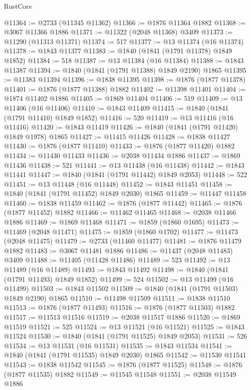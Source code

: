 \begin{lexlean}{RustCore}
\begin{coremodule}
@11364 := @2733 (@11345 @11362)
@11366 := @1876 @11364 @1882
@11368 := @3067 @11366 @1886
@11371 := @11322 (@2048 @11368) @3409
@11373 := @11290 (@11313 @11371)
@11374 := 517
@11377 := @13 @11374 (@16 @11374)
@11378 := @1843 @11377
@11383 := @1840 (@1841 (@1791 @11378) @1849 @1852)
@11384 := 518
@11387 := @13 @11384 (@16 @11384)
@11388 := @1843 @11387
@11394 := @1840 (@1841 (@1791 @11388) @1849 @2190) @1865
@11395 := @11383 @11394
@11396 := @1838 @11395
@11398 := @1876 (@1877 @11378)
@11401 := @1876 (@1877 @11388) @1882
@11402 := @11398 @11401
@11404 := @1874 @11402 @1886
@11405 := @1869 @11404
@11406 := 519
@11409 := @13 @11406 (@16 @11406)
@11410 := @1843 @11409
@11415 := @1840 (@1841 (@1791 @11410) @1849 @1852)
@11416 := 520
@11419 := @13 @11416 (@16 @11416)
@11420 := @1843 @11419
@11426 := @1840 (@1841 (@1791 @11420) @1849 @1978) @1865
@11427 := @11415 @11426
@11428 := @1838 @11427
@11430 := @1876 (@1877 @11410)
@11433 := @1876 (@1877 @11420) @1882
@11434 := @11430 @11433
@11436 := @2038 @11434 @1886
@11437 := @1869 @11436
@11438 := 521
@11441 := @13 @11438 (@16 @11438)
@11442 := @1843 @11441
@11447 := @1840 (@1841 (@1791 @11442) @1849 @2053)
@11448 := 522
@11451 := @13 @11448 (@16 @11448)
@11452 := @1843 @11451
@11458 := @1840 (@1841 (@1791 @11452) @1849 @2030) @1865
@11459 := @11447 @11458
@11460 := @1838 @11459
@11462 := @1876 (@1877 @11442)
@11465 := @1876 (@1877 @11452) @1882
@11466 := @11462 @11465
@11468 := @2038 @11466 @1886
@11469 := @1869 @11468
@11471 := @1859 (@1860 @1695)
@11473 := @11469 (@2048 @11471)
@11475 := @1859 (@1860 @1702)
@11477 := @11473 (@2048 @11475)
@11479 := @2733 (@11460 @11477)
@11481 := @1876 @11479 @1882
@11483 := @3067 @11481 @1886
@11486 := @11437 (@2048 @11483) @3409
@11488 := @11405 (@11428 @11486)
@11489 := 523
@11492 := @13 @11489 (@16 @11489)
@11493 := @1843 @11492
@11498 := @1840 (@1841 (@1791 @11493) @1849 @1852)
@11499 := 524
@11502 := @13 @11499 (@16 @11499)
@11503 := @1843 @11502
@11509 := @1840 (@1841 (@1791 @11503) @1849 @2190) @1865
@11510 := @11498 @11509
@11511 := @1838 @11510
@11513 := @1876 (@1877 @11493)
@11516 := @1876 (@1877 @11503) @1882
@11517 := @11513 @11516
@11519 := @2038 @11517 @1886
@11520 := @1869 @11519
@11521 := 525
@11524 := @13 @11521 (@16 @11521)
@11525 := @1843 @11524
@11530 := @1840 (@1841 (@1791 @11525) @1849 @2053)
@11531 := 526
@11534 := @13 @11531 (@16 @11531)
@11535 := @1843 @11534
@11541 := @1840 (@1841 (@1791 @11535) @1849 @2030) @1865
@11542 := @11530 @11541
@11543 := @1838 @11542
@11545 := @1876 (@1877 @11525)
@11548 := @1876 (@1877 @11535) @1882
@11549 := @11545 @11548
@11551 := @2038 @11549 @1886

\end{coremodule}
\end{lexlean}
